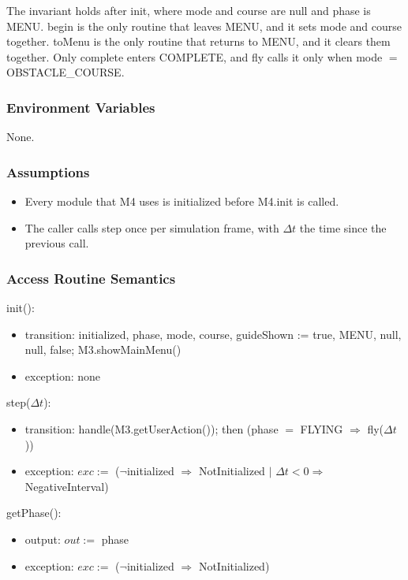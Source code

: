 \documentclass[12pt, titlepage]{article}
\newcommand{\True}{\textnormal{true}}
\newcommand{\False}{\textnormal{false}}
\newcommand{\nul}{\textnormal{null}}
\newcommand{\noinit}{$\neg$initialized $\Rightarrow$ NotInitialized}
\begin{document}
The invariant holds after init, where mode and course are \nul{} and phase is
MENU. begin is the only routine that leaves MENU, and it sets mode and course
together. toMenu is the only routine that returns to MENU, and it clears them
together. Only complete enters COMPLETE, and fly calls it only when mode $=$
OBSTACLE\_COURSE.

\subsubsection{Environment Variables}

None.

\subsubsection{Assumptions}

\begin{itemize}
\item Every module that M4 uses is initialized before M4.init is called.
\item The caller calls step once per simulation frame, with $\Delta t$ the time
  since the previous call.
\end{itemize}

\subsubsection{Access Routine Semantics}

\noindent init():
\begin{itemize}
\item transition: initialized, phase, mode, course, guideShown := \True, MENU,
  \nul, \nul, \False; M3.showMainMenu()
\item exception: none
\end{itemize}

\noindent step($\Delta t$):
\begin{itemize}
\item transition: handle(M3.getUserAction()); then (phase $=$ FLYING
  $\Rightarrow$ fly($\Delta t$))
\item exception: $exc :=$ (\noinit{} $|$ $\Delta t < 0 \Rightarrow$
  NegativeInterval)
\end{itemize}

\noindent getPhase():
\begin{itemize}
\item output: $out :=$ phase
\item exception: $exc :=$ (\noinit)
\end{itemize}
\end{document}
